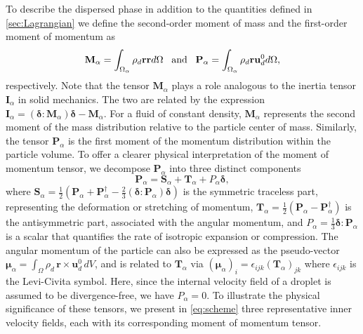 To describe the dispersed phase in addition to the quantities defined in \ref{sec:Lagrangian} we define the second-order moment of mass and the first-order moment of momentum as 
\begin{equation}
    \textbf{M}_\alpha 
    = \intO{ \rho_d \textbf{r} \textbf{r} }
    \;\;\;\text{and}\;\;\;
    \textbf{P}_\alpha 
    = \intO{ \rho_d \textbf{r} \textbf{u}_d^0 },
    \label{eq:first_moment_of_momentum_def}
\end{equation}
respectively. 
Note that the tensor $\textbf{M}_\alpha$ plays a role analogous to the inertia tensor $\textbf{I}_\alpha$ in solid mechanics. 
The two are related by the expression  $\textbf{I}_\alpha = (\bm\delta : \textbf{M}_\alpha)\bm\delta - \textbf{M}_\alpha$.
For a fluid of constant density, $\textbf{M}_\alpha$ represents the second moment of the mass distribution relative to the particle center of mass.
Similarly, the tensor $\textbf{P}_\alpha$ is the first moment of the momentum distribution within the particle volume. 
To offer a clearer physical interpretation of the moment of momentum tensor, we decompose $\textbf{P}_\alpha$ into three distinct components  
\begin{equation}
\textbf{P}_\alpha = \textbf{S}_\alpha + \textbf{T}_\alpha + P_\alpha \bm\delta,
\end{equation}
where $\textbf{S}_\alpha = \frac{1}{2}\left(\textbf{P}_\alpha + \textbf{P}_\alpha^\dagger - \frac{2}{3}(\bm\delta:\textbf{P}_\alpha)\bm\delta\right)$ is the symmetric traceless part, representing the  deformation or stretching of momentum,
$\textbf{T}_\alpha = \frac{1}{2}(\textbf{P}_\alpha - \textbf{P}_\alpha^\dagger)$ is the antisymmetric part, associated with the angular momentum,
and $P_\alpha = \frac{1}{3} \bm\delta : \textbf{P}_\alpha$ is a scalar that quantifies the rate of isotropic expansion or compression. 
The angular momentum of the particle can also be expressed as the pseudo-vector  
$\bm\mu_\alpha = \int_\Omega \rho_d\, \textbf{r} \times \textbf{u}_d^0 \, dV$,
and is related to $\textbf{T}_\alpha$ via $(\bm\mu_\alpha)_i = \epsilon_{ijk} (\textbf{T}_\alpha)_{jk}$ %
where $\epsilon_{ijk}$ is the Levi-Civita symbol.
Here, since the internal velocity field of a droplet is assumed to be divergence-free, we have $P_\alpha = 0$. 
To illustrate the physical significance of these tensors, we present in \ref{eq:scheme} three representative inner velocity fields, each with its corresponding moment of momentum tensor.
